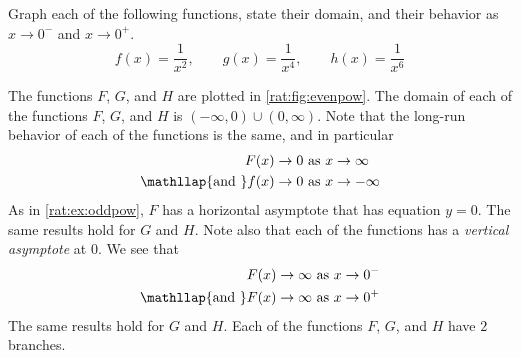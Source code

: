 	 \begin{pccexample}\label{rat:ex:evenpow}%
		 Graph each of the following functions, state their domain, and their
		 behavior as $x\rightarrow 0^-$ and $x\rightarrow 0^+$.
		 \[
			 f(x)=\frac{1}{x^2},\qquad g(x)=\frac{1}{x^4},\qquad h(x)=\frac{1}{x^6}
		 \]
		 \begin{pccsolution}
			 The functions $F$, $G$, and $H$ are plotted in \cref{rat:fig:evenpow}.
			 The domain of each of the functions $F$, $G$, and $H$ is $(-\infty,0)\cup (0,\infty)$. Note that
			 the long-run behavior of each of the functions is the same, and in particular
			 \begin{align*}
				 F(x)\rightarrow 0                           & \text{ as } x\rightarrow\infty  \\
				 \mathllap{\text{and }}    f(x)\rightarrow 0 & \text{ as } x\rightarrow-\infty
			 \end{align*}
			 As in \cref{rat:ex:oddpow}, $F$ has a horizontal asymptote  that
			 has equation $y=0$.
			 The same results hold for $G$ and $H$. Note also that each of the functions
			 has a \emph{vertical asymptote} at $0$. We see that
			 \begin{align*}
				 F(x)\rightarrow \infty                          & \text{ as } x\rightarrow 0^- \\
				 \mathllap{\text{and }}   F(x)\rightarrow \infty & \text{ as } x\rightarrow 0^+
			 \end{align*}
			 The same results hold for $G$ and $H$. Each of the functions $F$, $G$, and $H$
			 have $2$ branches.
		 \end{pccsolution}
	 \end{pccexample}
